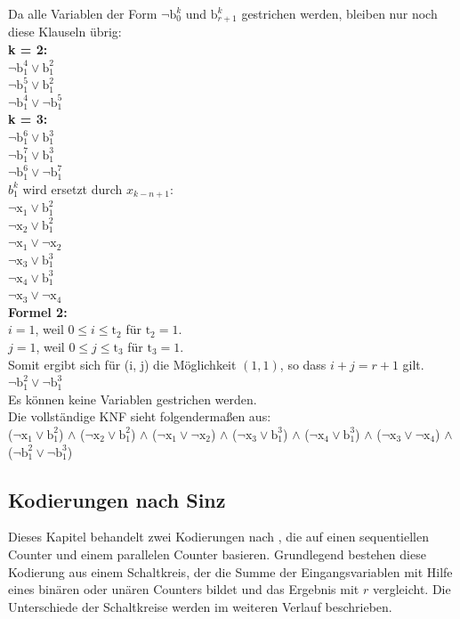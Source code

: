 \documentclass[a4,abstract=on]{scrartcl}
\begin{document}
Da alle Variablen der Form $\neg \text{b}_0^k$ und $\text{b}_{r+1}^k$  gestrichen werden, bleiben nur noch diese Klauseln übrig:\\
\textbf{k = 2:}\\
$\neg \text{b}_1^4  \vee \text{b}_1^2$\\
$\neg \text{b}_1^5 \vee \text{b}_1^2$\\
$\neg \text{b}_1^4 \vee \neg \text{b}_1^5$\\
\textbf{k = 3:}\\
$\neg \text{b}_1^6 \vee \text{b}_1^3$\\
$\neg \text{b}_1^7 \vee \text{b}_1^3$\\
$\neg \text{b}_1^6 \vee \neg \text{b}_1^7 $\\

$b_1^k$ wird ersetzt durch $x_{k-n+1}$:\\
$ \neg \text{x}_1 \vee \text{b}_1^2$\\
$\neg \text{x}_2 \vee  \text{b}_1^2$\\
$\neg \text{x}_1 \vee \neg \text{x}_2$\\
$\neg \text{x}_3 \vee \text{b}_1^3$\\
$\neg \text{x}_4 \vee \text{b}_1^3$\\
$\neg \text{x}_3 \vee \neg \text{x}_4$\\

\textbf{Formel 2:}\\
$i=1$, weil $0\leq i \leq \text{t}_2$ für $\text{t}_2 = 1$.\\
$j=1$, weil $0\leq j \leq \text{t}_3$ für $\text{t}_3=1$.\\
Somit ergibt sich für (i, j) die Möglichkeit $(1,1)$, so dass $i+j = r+1$ gilt.\\
$\neg \text{b}_1^2 \vee \neg \text{b}_1^3$\\

Es können keine Variablen gestrichen werden.\\

Die vollständige KNF sieht folgendermaßen aus:\\
($ \neg \text{x}_1 \vee \text{b}_1^2$) $\wedge$ ($\neg \text{x}_2 \vee \text{b}_1^2$) $\wedge$ ($\neg \text{x}_1 \vee \neg \text{x}_2$) $\wedge$ ($\neg \text{x}_3 \vee \text{b}_1^3$) $\wedge$ ($\neg \text{x}_4 \vee \text{b}_1^3$) $\wedge$ ($\neg \text{x}_3 \vee \neg \text{x}_4$) $\wedge$ ($\neg \text{b}_1^2 \vee \neg \text{b}_1^3$)\\

	\subsection{Kodierungen nach Sinz}
Dieses Kapitel behandelt zwei Kodierungen nach \cite[][]{sinz}, die auf einen sequentiellen Counter und einem parallelen Counter basieren. Grundlegend bestehen diese Kodierung aus einem Schaltkreis, der die Summe der Eingangsvariablen mit Hilfe eines binären oder unären Counters bildet und das Ergebnis mit $r$ vergleicht. Die Unterschiede der Schaltkreise werden im weiteren Verlauf beschrieben.
\end{document}
